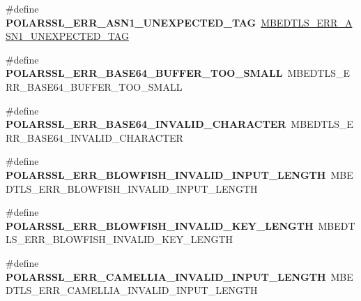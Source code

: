 \begin{DoxyCompactItemize}
\item 
\mbox{\label{compat-1_83_8h_a171798e67a7a1024ab5e1c12c73f0537}} 
\#define {\bfseries P\+O\+L\+A\+R\+S\+S\+L\+\_\+\+E\+R\+R\+\_\+\+A\+S\+N1\+\_\+\+U\+N\+E\+X\+P\+E\+C\+T\+E\+D\+\_\+\+T\+AG}~\mbox{\hyperlink{group__asn1__module_gab055945fda47ad0e16dc59f8c5ecb86e}{M\+B\+E\+D\+T\+L\+S\+\_\+\+E\+R\+R\+\_\+\+A\+S\+N1\+\_\+\+U\+N\+E\+X\+P\+E\+C\+T\+E\+D\+\_\+\+T\+AG}}
\item 
\mbox{\label{compat-1_83_8h_a9a778cc91797eec1df0548e1f4afd997}} 
\#define {\bfseries P\+O\+L\+A\+R\+S\+S\+L\+\_\+\+E\+R\+R\+\_\+\+B\+A\+S\+E64\+\_\+\+B\+U\+F\+F\+E\+R\+\_\+\+T\+O\+O\+\_\+\+S\+M\+A\+LL}~M\+B\+E\+D\+T\+L\+S\+\_\+\+E\+R\+R\+\_\+\+B\+A\+S\+E64\+\_\+\+B\+U\+F\+F\+E\+R\+\_\+\+T\+O\+O\+\_\+\+S\+M\+A\+LL
\item 
\mbox{\label{compat-1_83_8h_a8fac8bb4d3ed57b1beb10bf617664a1d}} 
\#define {\bfseries P\+O\+L\+A\+R\+S\+S\+L\+\_\+\+E\+R\+R\+\_\+\+B\+A\+S\+E64\+\_\+\+I\+N\+V\+A\+L\+I\+D\+\_\+\+C\+H\+A\+R\+A\+C\+T\+ER}~M\+B\+E\+D\+T\+L\+S\+\_\+\+E\+R\+R\+\_\+\+B\+A\+S\+E64\+\_\+\+I\+N\+V\+A\+L\+I\+D\+\_\+\+C\+H\+A\+R\+A\+C\+T\+ER
\item 
\mbox{\label{compat-1_83_8h_a776d91162e4c250f4b2625884e52a54f}} 
\#define {\bfseries P\+O\+L\+A\+R\+S\+S\+L\+\_\+\+E\+R\+R\+\_\+\+B\+L\+O\+W\+F\+I\+S\+H\+\_\+\+I\+N\+V\+A\+L\+I\+D\+\_\+\+I\+N\+P\+U\+T\+\_\+\+L\+E\+N\+G\+TH}~M\+B\+E\+D\+T\+L\+S\+\_\+\+E\+R\+R\+\_\+\+B\+L\+O\+W\+F\+I\+S\+H\+\_\+\+I\+N\+V\+A\+L\+I\+D\+\_\+\+I\+N\+P\+U\+T\+\_\+\+L\+E\+N\+G\+TH
\item 
\mbox{\label{compat-1_83_8h_a56226b271b174aba0746c23d2d085a74}} 
\#define {\bfseries P\+O\+L\+A\+R\+S\+S\+L\+\_\+\+E\+R\+R\+\_\+\+B\+L\+O\+W\+F\+I\+S\+H\+\_\+\+I\+N\+V\+A\+L\+I\+D\+\_\+\+K\+E\+Y\+\_\+\+L\+E\+N\+G\+TH}~M\+B\+E\+D\+T\+L\+S\+\_\+\+E\+R\+R\+\_\+\+B\+L\+O\+W\+F\+I\+S\+H\+\_\+\+I\+N\+V\+A\+L\+I\+D\+\_\+\+K\+E\+Y\+\_\+\+L\+E\+N\+G\+TH
\item 
\mbox{\label{compat-1_83_8h_a0638bc59431e0d199ffc8353feb738aa}} 
\#define {\bfseries P\+O\+L\+A\+R\+S\+S\+L\+\_\+\+E\+R\+R\+\_\+\+C\+A\+M\+E\+L\+L\+I\+A\+\_\+\+I\+N\+V\+A\+L\+I\+D\+\_\+\+I\+N\+P\+U\+T\+\_\+\+L\+E\+N\+G\+TH}~M\+B\+E\+D\+T\+L\+S\+\_\+\+E\+R\+R\+\_\+\+C\+A\+M\+E\+L\+L\+I\+A\+\_\+\+I\+N\+V\+A\+L\+I\+D\+\_\+\+I\+N\+P\+U\+T\+\_\+\+L\+E\+N\+G\+TH

\end{DoxyCompactItemize}
